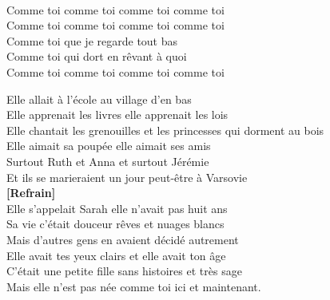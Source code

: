 \documentclass{novel}
\begin{document}
{\begin{minipage}[t][0.65\textheight][t]{\textwidth}
\begin{multicols}{2}
\begin{bfseries}
[Refrain:]\\
Comme toi comme toi comme toi comme toi \\
Comme toi comme toi comme toi comme toi \\
Comme toi que je regarde tout bas \\
Comme toi qui dort en rêvant à quoi \\
Comme toi comme toi comme toi comme toi \\
\end{bfseries}

\columnbreak

Elle allait à l'école au village d'en bas \\
Elle apprenait les livres elle apprenait les lois \\
Elle chantait les grenouilles et les princesses qui dorment au bois \\
Elle aimait sa poupée elle aimait ses amis \\
Surtout Ruth et Anna et surtout Jérémie \\
Et ils se marieraient un jour peut-être à Varsovie \\

\textbf{[Refrain]}\\

Elle s'appelait Sarah elle n'avait pas huit ans \\
Sa vie c'était douceur rêves et nuages blancs \\
Mais d'autres gens en avaient décidé autrement \\
Elle avait tes yeux clairs et elle avait ton âge \\
C'était une petite fille sans histoires et très sage \\
Mais elle n'est pas née comme toi ici et maintenant. \\

\end{multicols}
\end{minipage}
}
\end{document}
